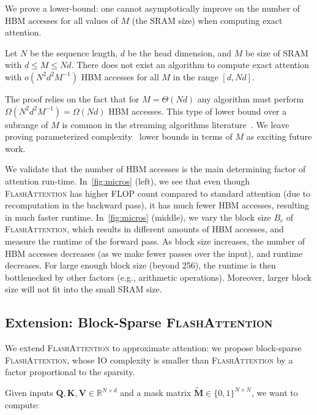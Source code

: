 We prove a lower-bound: one cannot asymptotically improve on the number of HBM accesses for all values of $M$ (the SRAM size) when computing exact attention.

\begin{proposition}\label{thm:lower_bound}
  Let $N$ be the sequence length, $d$ be the head dimension, and $M$ be size of SRAM with $d \leq M \leq Nd$. There does not exist an algorithm to compute exact attention with $o(N^2d^2 M^{-1})$ HBM accesses for all $M$ in the range $[d, Nd]$.
\end{proposition}

The proof relies on the fact that for $M = \Theta(Nd)$ any algorithm must perform
$\Omega ( N^2d^2M^{-1} ) = \Omega(Nd)$ HBM accesses. This type of lower bound over a subrange of $M$ is common in the streaming algorithms literature~\citep{woodruff2004optimal}. We leave proving parameterized complexity~\citep{flum2006parameterized} lower bounds in terms of $M$ as exciting future work.

We validate that the number of HBM accesses is the main determining factor of attention run-time.
In~\ref{fig:micros} (left), we see that even though \textsc{FlashAttention} has higher FLOP count compared to standard attention (due to recomputation in the backward pass), it has much fewer HBM accesses, resulting in much faster runtime.
In~\ref{fig:micros} (middle), we vary the block size $B_c$ of \textsc{FlashAttention}, which results in different amounts of HBM accesses, and measure the runtime of the forward pass. As block size increases, the number of HBM accesses decreases (as we make fewer passes over the input), and runtime decreases. For large enough block size (beyond 256), the runtime is then bottlenecked by other factors (e.g., arithmetic operations). Moreover, larger block size will not fit into the small SRAM size.

\subsection{Extension: Block-Sparse \textsc{FlashAttention}}
\label{sec:blocks_sparse}

We extend \textsc{FlashAttention} to approximate attention: we propose block-sparse \textsc{FlashAttention}, whose IO complexity is smaller than \textsc{FlashAttention} by a factor proportional to the sparsity.

Given inputs $\mathbf{Q}, \mathbf{K}, \mathbf{V} \in \mathbb{R}^{N \times d}$ and a mask matrix
$\tilde{\mathbf{M}} \in \{ 0, 1 \}^{N \times N}$, we want to compute:

